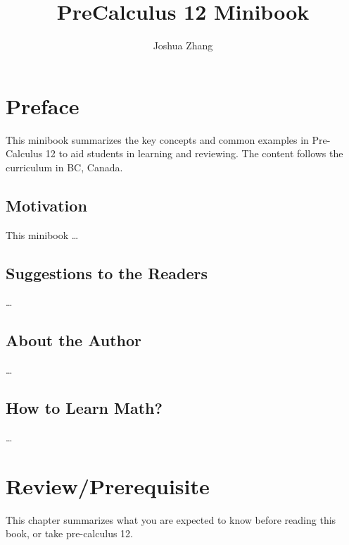 \documentclass[
]{book}
\title{PreCalculus 12 Minibook}
\author{Joshua Zhang}
\date{}
\theoremstyle{definition}
\theoremstyle{definition}
\theoremstyle{definition}
\theoremstyle{definition}
\theoremstyle{remark}
\begin{document}
\maketitle

{
\setcounter{tocdepth}{1}
\tableofcontents
}
\hypertarget{preface}{%
\chapter*{Preface}\label{preface}}

This minibook summarizes the key concepts and common examples in Pre-Calculus 12 to aid students in learning and reviewing. The content follows the curriculum in BC, Canada.

\hypertarget{motivation}{%
\section{Motivation}\label{motivation}}

This minibook \ldots{}

\hypertarget{suggestions-to-the-readers}{%
\section{Suggestions to the Readers}\label{suggestions-to-the-readers}}

\ldots{}

\hypertarget{about-the-author}{%
\section{About the Author}\label{about-the-author}}

\ldots{}

\hypertarget{how-to-learn-math}{%
\section{How to Learn Math?}\label{how-to-learn-math}}

\ldots{}

\hypertarget{reviewprerequisite}{%
\chapter*{Review/Prerequisite}\label{reviewprerequisite}}

This chapter summarizes what you are expected to know before reading this book, or take pre-calculus 12.
\end{document}
